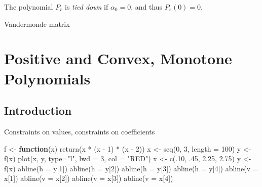\documentclass[
  12pt,
  letterpaper,
  DIV=11,
  numbers=noendperiod]{scrreprt}
\newenvironment{Shaded}{\begin{snugshade}}{\end{snugshade}}
\newcommand{\AttributeTok}[1]{\textcolor[rgb]{0.40,0.45,0.13}{#1}}
\newcommand{\ControlFlowTok}[1]{\textcolor[rgb]{0.00,0.23,0.31}{\textbf{#1}}}
\newcommand{\DecValTok}[1]{\textcolor[rgb]{0.68,0.00,0.00}{#1}}
\newcommand{\FloatTok}[1]{\textcolor[rgb]{0.68,0.00,0.00}{#1}}
\newcommand{\FunctionTok}[1]{\textcolor[rgb]{0.28,0.35,0.67}{#1}}
\newcommand{\NormalTok}[1]{\textcolor[rgb]{0.00,0.23,0.31}{#1}}
\newcommand{\OtherTok}[1]{\textcolor[rgb]{0.00,0.23,0.31}{#1}}
\newcommand{\SpecialCharTok}[1]{\textcolor[rgb]{0.37,0.37,0.37}{#1}}
\newcommand{\StringTok}[1]{\textcolor[rgb]{0.13,0.47,0.30}{#1}}
\theoremstyle{remark}
\begin{document}
The polynomial \(P_r\) is \emph{tied down} if \(\alpha_0=0\), and thus
\(P_r(0)=0\).

Vandermonde matrix

\section{Positive and Convex, Monotone
Polynomials}\label{positive-and-convex-monotone-polynomials}

\subsection{Introduction}\label{introduction-1}

Constraints on values, constraints on coefficients

\begin{Shaded}
\begin{Highlighting}[]
\NormalTok{f }\OtherTok{\textless{}{-}} \ControlFlowTok{function}\NormalTok{(x) }\FunctionTok{return}\NormalTok{(x }\SpecialCharTok{*}\NormalTok{ (x }\SpecialCharTok{{-}} \DecValTok{1}\NormalTok{) }\SpecialCharTok{*}\NormalTok{ (x }\SpecialCharTok{{-}} \DecValTok{2}\NormalTok{))}
\NormalTok{x }\OtherTok{\textless{}{-}} \FunctionTok{seq}\NormalTok{(}\DecValTok{0}\NormalTok{, }\DecValTok{3}\NormalTok{, }\AttributeTok{length =} \DecValTok{100}\NormalTok{)}
\NormalTok{y }\OtherTok{\textless{}{-}} \FunctionTok{f}\NormalTok{(x)}
\FunctionTok{plot}\NormalTok{(x, y, }\AttributeTok{type=}\StringTok{"l"}\NormalTok{, }\AttributeTok{lwd =} \DecValTok{3}\NormalTok{, }\AttributeTok{col =} \StringTok{"RED"}\NormalTok{)}
\NormalTok{x }\OtherTok{\textless{}{-}} \FunctionTok{c}\NormalTok{(.}\DecValTok{10}\NormalTok{, .}\DecValTok{45}\NormalTok{, }\FloatTok{2.25}\NormalTok{, }\FloatTok{2.75}\NormalTok{)}
\NormalTok{y }\OtherTok{\textless{}{-}} \FunctionTok{f}\NormalTok{(x)}
\FunctionTok{abline}\NormalTok{(}\AttributeTok{h =}\NormalTok{ y[}\DecValTok{1}\NormalTok{])}
\FunctionTok{abline}\NormalTok{(}\AttributeTok{h =}\NormalTok{ y[}\DecValTok{2}\NormalTok{])}
\FunctionTok{abline}\NormalTok{(}\AttributeTok{h =}\NormalTok{ y[}\DecValTok{3}\NormalTok{])}
\FunctionTok{abline}\NormalTok{(}\AttributeTok{h =}\NormalTok{ y[}\DecValTok{4}\NormalTok{])}
\FunctionTok{abline}\NormalTok{(}\AttributeTok{v =}\NormalTok{ x[}\DecValTok{1}\NormalTok{])}
\FunctionTok{abline}\NormalTok{(}\AttributeTok{v =}\NormalTok{ x[}\DecValTok{2}\NormalTok{])}
\FunctionTok{abline}\NormalTok{(}\AttributeTok{v =}\NormalTok{ x[}\DecValTok{3}\NormalTok{])}
\FunctionTok{abline}\NormalTok{(}\AttributeTok{v =}\NormalTok{ x[}\DecValTok{4}\NormalTok{])}
\end{Highlighting}
\end{Shaded}
\end{document}
